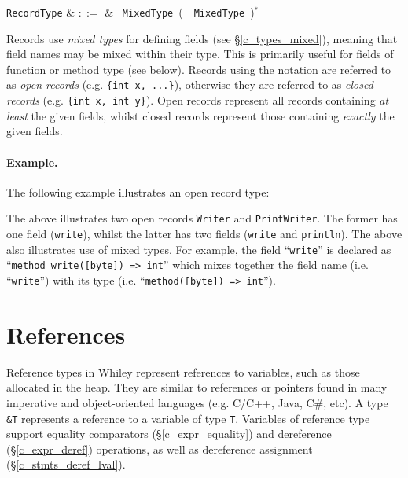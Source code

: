 \begin{syntax}
  \verb+RecordType+ & $::=$ & \token{\{}\ \verb+MixedType+\
  \big(\ \token{,}\ \verb+MixedType+\
  \big)$^*$ \ \token{\}}\\
\end{syntax}

Records use {\em mixed types} for defining fields (see \S\ref{c_types_mixed}), meaning that field names may be mixed within their type.  This is primarily useful for fields of function or method type (see below).  Records using the  notation are referred to as {\em open records} (e.g. \lstinline|{int x, ...}|), otherwise they are referred to as {\em closed records} (e.g. \lstinline|{int x, int y}|).  Open records represent all records containing {\em at least} the given fields, whilst closed records represent those containing {\em exactly} the given fields.   
\paragraph{Example.} The following example illustrates an open record type: 



The above illustrates two open records \lstinline{Writer} and \lstinline{PrintWriter}.  The former has one field (\lstinline{write}), whilst the latter has two fields (\lstinline{write} and \lstinline{println}).  The above also illustrates use of mixed types.  For example, the field ``\lstinline{write}'' is declared as ``\lstinline{method write([byte]) => int}'' which mixes together the field name (i.e. ``\lstinline{write}'') with its type (i.e. ``\lstinline{method([byte]) => int}'').


\section{References}

Reference types in Whiley represent references to variables, such as those allocated in the heap.  They are similar to references or pointers found in many imperative and object-oriented languages (e.g. C/C++, Java, C\#, etc).  A type \lstinline{&T} represents a reference to a variable of type \lstinline{T}.  Variables of reference type support equality comparators (\S\ref{c_expr_equality}) and dereference (\S\ref{c_expr_deref}) operations, as well as dereference assignment (\S\ref{c_stmts_deref_lval}).

